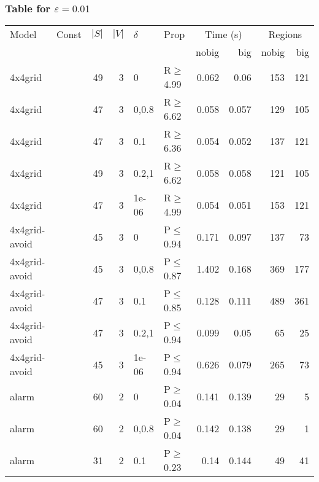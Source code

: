 \subsubsection{Table for \(\varepsilon=0.01\)}
\begin{longtable}{llrrllrrrr}

        \toprule
        Model & Const & $|S|$ & $|V|$ & $\delta$ & Prop & \multicolumn{2}{c}{Time (s)} & \multicolumn{2}{c}{Regions} \\
        \cmidrule(ll){7-8} \cmidrule(ll){9-10}
        & & & & & & nobig & big & nobig & big \\
        \midrule
        
 4x4grid       &          &     	49 &   3 & 0     & R$\geq$4.99  & 0.062   & 0.06    & 153     & 121    \\
 4x4grid       &          &     	47 &   3 & 0,0.8 & R$\geq$6.62  & 0.058   & 0.057   & 129     & 105    \\
 4x4grid       &          &     	47 &   3 & 0.1   & R$\geq$6.36  & 0.054   & 0.052   & 137     & 121    \\
 4x4grid       &          &     	49 &   3 & 0.2,1 & R$\geq$6.62  & 0.058   & 0.058   & 121     & 105    \\
 4x4grid       &          &     	47 &   3 & 1e-06 & R$\geq$4.99  & 0.054   & 0.051   & 153     & 121    \\
 4x4grid-avoid &          &     	45 &   3 & 0     & P$\leq$0.94  & 0.171   & 0.097   & 137     & 73     \\
 4x4grid-avoid &          &     	45 &   3 & 0,0.8 & P$\leq$0.87  & 1.402   & 0.168   & 369     & 177    \\
 4x4grid-avoid &          &     	47 &   3 & 0.1   & P$\leq$0.85  & 0.128   & 0.111   & 489     & 361    \\
 4x4grid-avoid &          &     	47 &   3 & 0.2,1 & P$\leq$0.94  & 0.099   & 0.05    & 65      & 25     \\
 4x4grid-avoid &          &     	45 &   3 & 1e-06 & P$\leq$0.94  & 0.626   & 0.079   & 265     & 73     \\
 alarm         &          &     	60 &   2 & 0     & P$\geq$0.04  & 0.141   & 0.139   & 29      & 5      \\
 alarm         &          &     	60 &   2 & 0,0.8 & P$\geq$0.04  & 0.142   & 0.138   & 29      & 1      \\
 alarm         &          &     	31 &   2 & 0.1   & P$\geq$0.23  & 0.14    & 0.144   & 49      & 41     \\

\end{longtable}
